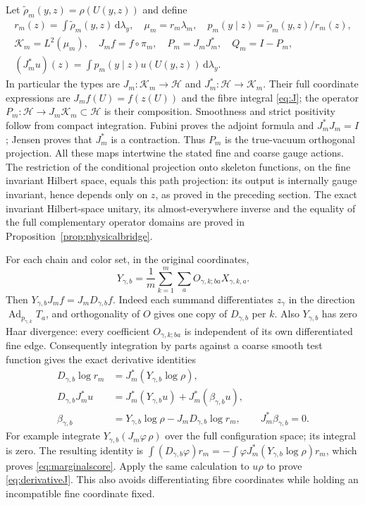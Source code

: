 \documentclass[11pt]{article}
\newcommand{\dd}{\,\mathrm d}
\newcommand{\HH}{\mathscr H}
\newcommand{\KK}{\mathscr K}
\begin{document}
Let $\widetilde\rho_m(y,z)=\rho(U(y,z))$ and define
\begin{gather}
 r_m(z)=\int\widetilde\rho_m(y,z)\dd\lambda_y,
 \quad \mu_m=r_m\lambda_m,\quad
 p_m(y\mid z)=\widetilde\rho_m(y,z)/r_m(z),\label{eq:coarsedensity}\\
 \KK_m=L^2(\mu_m),\quad J_m f=f\circ\pi_m,\quad
 P_m=J_mJ_m^*,\quad Q_m=I-P_m,\nonumber\\
 (J_m^*u)(z)=\int p_m(y\mid z)u(U(y,z))\dd\lambda_y.\label{eq:J}
\end{gather}
In particular the types are $J_m:\KK_m\to\HH$ and
$J_m^*:\HH\to\KK_m$. Their full coordinate expressions are
$J_mf(U)=f(z(U))$ and the fibre integral \eqref{eq:J};
the operator $P_m:\HH\to J_m\KK_m\subset\HH$ is their composition.
Smoothness and strict positivity follow from compact integration.
Fubini proves the adjoint formula and $J_m^*J_m=I$; Jensen proves that
$J_m^*$ is a contraction. Thus $P_m$ is the true-vacuum orthogonal
projection. All these maps intertwine the stated fine and coarse gauge
actions. The restriction of the conditional projection onto skeleton
functions, on the fine invariant Hilbert space, equals this path projection:
its output is internally gauge invariant, hence depends only on $z$, as
proved in the preceding section. The exact invariant Hilbert-space
unitary, its almost-everywhere inverse and the equality of the full
complementary operator domains are proved in
Proposition~\ref{prop:physicalbridge}.

For each chain and color set, in the original coordinates,
\begin{equation}\label{eq:Y}
 Y_{\gamma,b}=\frac1m\sum_{k=1}^m\sum_a
                   O_{\gamma,k;ba}X_{\gamma,k,a}.
\end{equation}
Then $Y_{\gamma,b}J_mf=J_mD_{\gamma,b}f$.
Indeed each summand differentiates $z_\gamma$ in the direction
$\operatorname{Ad}_{p_{\gamma,k}}T_a$, and orthogonality of $O$ gives
one copy of $D_{\gamma,b}$ per $k$.
Also $Y_{\gamma,b}$ has zero Haar divergence: every coefficient
$O_{\gamma,k;ba}$ is independent of its own differentiated fine edge.
Consequently integration by parts against a coarse smooth test function
gives the exact derivative identities
\begin{align}
 D_{\gamma,b}\log r_m&=J_m^*(Y_{\gamma,b}\log\rho),\label{eq:marginalscore}\\
 D_{\gamma,b}J_m^*u
   &=J_m^*(Y_{\gamma,b}u)+J_m^*(\beta_{\gamma,b}u),\label{eq:derivativeJ}\\
 \beta_{\gamma,b}&=Y_{\gamma,b}\log\rho
                       -J_mD_{\gamma,b}\log r_m,\qquad J_m^*\beta_{\gamma,b}=0.
 \label{eq:beta}
\end{align}
For example integrate $Y_{\gamma,b}(J_m\varphi\,\rho)$ over the full
configuration space; its integral is zero. The resulting identity is
$\int(D_{\gamma,b}\varphi)r_m=-\int\varphi J_m^*(Y_{\gamma,b}\log\rho)r_m$,
which proves \eqref{eq:marginalscore}. Apply the same calculation to
$u\rho$ to prove \eqref{eq:derivativeJ}. This also avoids differentiating
fibre coordinates while holding an incompatible fine coordinate fixed.
\end{document}
